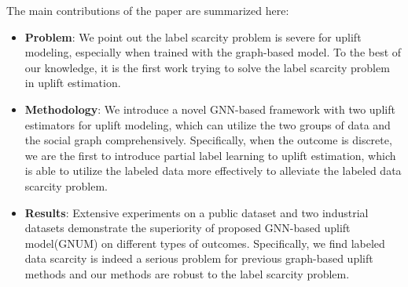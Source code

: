 The main contributions of the paper are summarized here:
\begin{itemize}
    \item \textbf{Problem}: We point out the label scarcity problem is severe for uplift modeling, especially when trained with the graph-based model. To the best of our knowledge, it is the first work trying to solve the label scarcity problem in uplift estimation.
    \item \textbf{Methodology}: We introduce a novel GNN-based framework with two uplift estimators for uplift modeling, which can utilize the two groups of data and the social graph comprehensively. Specifically, when the outcome is discrete, we are the first to introduce partial label learning to uplift estimation, which is able to utilize the labeled data more effectively to alleviate the labeled data scarcity problem.
    \item \textbf{Results}: Extensive experiments on a public dataset and two industrial datasets demonstrate the superiority of proposed GNN-based uplift model(GNUM) on different types of outcomes. Specifically, we find labeled data scarcity is indeed a serious problem for previous graph-based uplift methods and our methods are robust to the label scarcity problem. 
\end{itemize}
